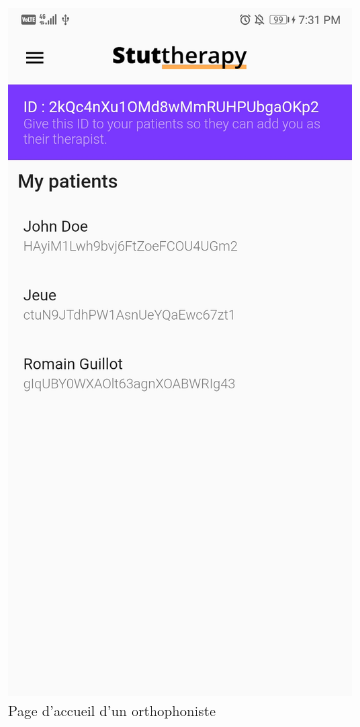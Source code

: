 \begin{appendices}
\begin{landscape}
\begin{figure}[h]
\begin{subfigure}{.25\textwidth}
    \includegraphics[width=.75\linewidth]{content/imgs/screen14.jpg}
    \caption{Page d'accueil d'un orthophoniste}
  \end{subfigure}%
  \begin{subfigure}{.25\textwidth}
    \centering

\end{subfigure}
\end{figure}
\end{landscape}
\end{appendices}
